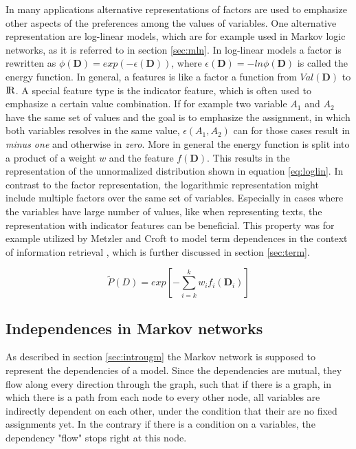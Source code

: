 In many applications alternative representations of factors are used to emphasize other aspects of the preferences among the values of variables. %
One alternative representation are log-linear models, which are for example used in Markov logic networks, as it is referred to in section \ref{sec:mln}. In log-linear models a factor is rewritten as $\phi(\mathbf{D}) = exp(-\epsilon(\mathbf{D}))$, where $\epsilon(\mathbf{D})=-ln\phi(\mathbf{D})$ is called the energy function. In general, a features is like a factor a function from $Val(\mathbf{D})$ to ${\rm I\!R}$. A special feature type is the indicator feature, which is often used to emphasize a certain value combination. If for example two variable $A_1$ and $A_2$ have the same set of values and the goal is to emphasize the assignment, in which both variables resolves in the same value, $\epsilon(A_1,A_2)$ can for those cases result in \textit{minus one} and otherwise in \textit{zero}. More in general the energy function is split into a product of a weight $w$ and the feature $f(\mathbf{D})$. This results in the representation of the unnormalized distribution shown in equation \ref{eq:loglin}. In contrast to the factor representation, the logarithmic representation might include multiple factors over the same set of variables. Especially in cases where the variables have large number of values, like when representing texts, the representation with indicator features can be beneficial. This property was for example utilized by Metzler and Croft to model term dependences in the context of information retrieval \cite{metzler2005markov}, which is further discussed in section \ref{sec:term}.

\begin{equation}
\widetilde{P}(D)=exp\left[-\sum_{i=k}^k{w_i f_i(\mathbf{D}_i)}\right]
\label{eq:loglin}
\end{equation}


\subsection{Independences in Markov networks} \label{sec:indep}

As described in section \ref{sec:introugm} the Markov network is supposed to represent the dependencies of a model. Since the dependencies are mutual, they flow along every direction through the graph, such that if there is a graph, in which there is a path from each node to every other node, all variables are indirectly dependent on each other, under the condition that their are no fixed assignments yet. In the contrary if there is a condition on a variables, the dependency "flow" stops right at this node.

